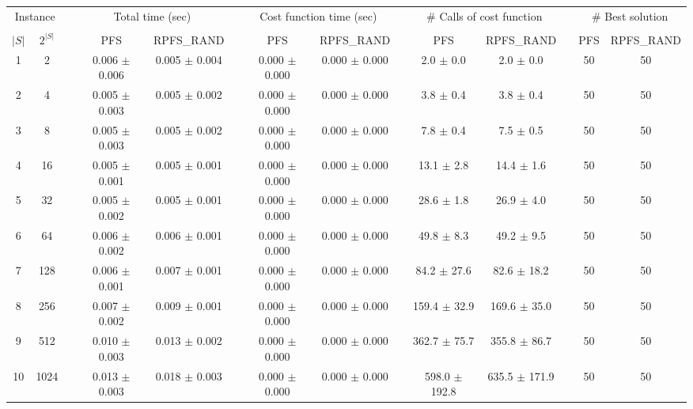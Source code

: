 \documentclass[11pt]{article}
\begin{document}
\begin{landscape}
\begin{table}
\centering
\footnotesize
\begin{tabular}{cccccccccccccc}
\toprule
\multicolumn{2}{c}{Instance} & \phantom{} & \multicolumn{2}{c}{Total time (sec)}  & \phantom{} & \multicolumn{2}{c}{Cost function time (sec)}  & \phantom{} & \multicolumn{2}{c}{\# Calls of cost function}  & \phantom{} & \multicolumn{2}{c}{\# Best solution}\\
\cline{1-2}\cline{4-5}\cline{7-8}\cline{10-11}\cline{13-14}\\
$|S|$ & $2^{|S|}$ && PFS & RPFS_RAND && PFS & RPFS_RAND && PFS & RPFS_RAND && PFS & RPFS_RAND \\
 1 &       2 &&  0.006 $\pm$ 0.006 & 0.005 $\pm$ 0.004 &&  0.000 $\pm$ 0.000 & 0.000 $\pm$ 0.000 &&   2.0 $\pm$  0.0 &  2.0 $\pm$  0.0 && 50& 50\\
 2 &       4 &&  0.005 $\pm$ 0.003 & 0.005 $\pm$ 0.002 &&  0.000 $\pm$ 0.000 & 0.000 $\pm$ 0.000 &&   3.8 $\pm$  0.4 &  3.8 $\pm$  0.4 && 50& 50\\
 3 &       8 &&  0.005 $\pm$ 0.003 & 0.005 $\pm$ 0.002 &&  0.000 $\pm$ 0.000 & 0.000 $\pm$ 0.000 &&   7.8 $\pm$  0.4 &  7.5 $\pm$  0.5 && 50& 50\\
 4 &      16 &&  0.005 $\pm$ 0.001 & 0.005 $\pm$ 0.001 &&  0.000 $\pm$ 0.000 & 0.000 $\pm$ 0.000 &&  13.1 $\pm$  2.8 & 14.4 $\pm$  1.6 && 50& 50\\
 5 &      32 &&  0.005 $\pm$ 0.002 & 0.005 $\pm$ 0.001 &&  0.000 $\pm$ 0.000 & 0.000 $\pm$ 0.000 &&  28.6 $\pm$  1.8 & 26.9 $\pm$  4.0 && 50& 50\\
 6 &      64 &&  0.006 $\pm$ 0.002 & 0.006 $\pm$ 0.001 &&  0.000 $\pm$ 0.000 & 0.000 $\pm$ 0.000 &&  49.8 $\pm$  8.3 & 49.2 $\pm$  9.5 && 50& 50\\
 7 &     128 &&  0.006 $\pm$ 0.001 & 0.007 $\pm$ 0.001 &&  0.000 $\pm$ 0.000 & 0.000 $\pm$ 0.000 &&  84.2 $\pm$ 27.6 & 82.6 $\pm$ 18.2 && 50& 50\\
 8 &     256 &&  0.007 $\pm$ 0.002 & 0.009 $\pm$ 0.001 &&  0.000 $\pm$ 0.000 & 0.000 $\pm$ 0.000 &&  159.4 $\pm$ 32.9 & 169.6 $\pm$ 35.0 && 50& 50\\
 9 &     512 &&  0.010 $\pm$ 0.003 & 0.013 $\pm$ 0.002 &&  0.000 $\pm$ 0.000 & 0.000 $\pm$ 0.000 &&  362.7 $\pm$ 75.7 & 355.8 $\pm$ 86.7 && 50& 50\\
10 &    1024 &&  0.013 $\pm$ 0.003 & 0.018 $\pm$ 0.003 &&  0.000 $\pm$ 0.000 & 0.000 $\pm$ 0.000 &&  598.0 $\pm$ 192.8 & 635.5 $\pm$ 171.9 && 50& 50\\

\end{tabular}
\end{table}
\end{landscape}
\end{document}
